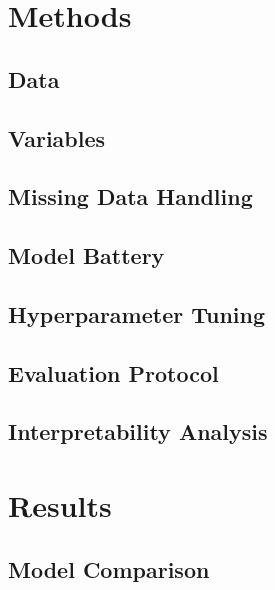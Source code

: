 \documentclass[sigconf]{acmart}
\begin{document}
{{%
\section{Methods}

\subsection{Data}

\subsection{Variables}

\subsection{Missing Data Handling}

\subsection{Model Battery}

\subsection{Hyperparameter Tuning}

\subsection{Evaluation Protocol}

\subsection{Interpretability Analysis}

\section{Results}

\subsection{Model Comparison}

}}
\end{document}
